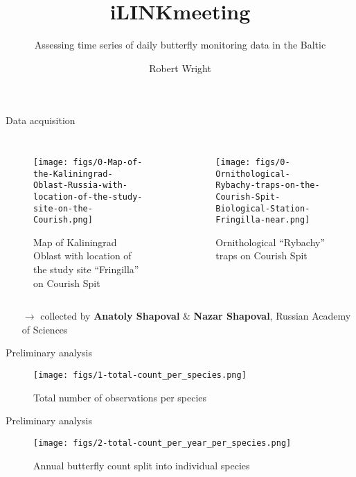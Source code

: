 \documentclass[english, xcolor=dvipsnames, 11pt]{beamer}
\title{iLINKmeeting}
\subtitle{Assessing time series of daily butterfly monitoring data in the Baltic}
\author{Robert Wright}
\institute{Botanical Institute of Barcelona (IBB)}
\date{\displaydate{prsnt}}
\begin{document}
	
	\maketitle
	
	
	\begin{frame}{Data acquisition}
		\begin{columns}[t]
		\begin{figure}
			\centering
			\texttt{[image: figs/0-Map-of-the-Kaliningrad-Oblast-Russia-with-location-of-the-study-site-on-the-Courish.png]}
			\caption{Map of Kaliningrad Oblast with location of the study site \enquote{Fringilla} on Courish Spit \parencite{shapoval2012}}
			\label{fig:site-location}
		\end{figure}
		\begin{figure}
			\centering
			\texttt{[image: figs/0-Ornithological-Rybachy-traps-on-the-Courish-Spit-Biological-Station-Fringilla-near.png]}
			\caption{Ornithological \enquote{Rybachy} traps on Courish Spit \parencite{shapoval2012}}
			\label{fig:traps}
		\end{figure}
		\end{columns}
		\begin{itemize}
			\item[\(\rightarrow\)] collected by \textbf{Anatoly Shapoval} \& \textbf{Nazar Shapoval}, Russian Academy of Sciences
		\end{itemize}
	\end{frame}
		
	
	\begin{frame}{Preliminary analysis}
		\begin{figure}
			\centering
			\texttt{[image: figs/1-total-count\_per\_species.png]}
			\caption{Total number of observations per species}
			\label{fig:total-count}
		\end{figure}
	\end{frame}

	
	\begin{frame}{Preliminary analysis}
		\begin{figure}
			\centering
			\texttt{[image: figs/2-total-count\_per\_year\_per\_species.png]}
			\caption{Annual butterfly count split into individual species}
			\label{fig:annual-count}
		\end{figure}
	\end{frame}
\end{document}

